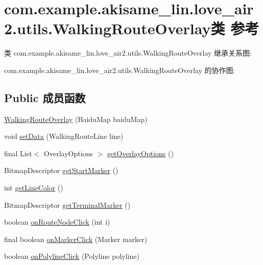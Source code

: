 \hypertarget{classcom_1_1example_1_1akisame__lin_1_1love__air2_1_1utils_1_1_walking_route_overlay}{}\section{com.\+example.\+akisame\+\_\+lin.\+love\+\_\+air2.\+utils.\+Walking\+Route\+Overlay类 参考}
\label{classcom_1_1example_1_1akisame__lin_1_1love__air2_1_1utils_1_1_walking_route_overlay}


类 com.\+example.\+akisame\+\_\+lin.\+love\+\_\+air2.\+utils.\+Walking\+Route\+Overlay 继承关系图\+:


com.\+example.\+akisame\+\_\+lin.\+love\+\_\+air2.\+utils.\+Walking\+Route\+Overlay 的协作图\+:
\subsection*{Public 成员函数}
\begin{DoxyCompactItemize}
\item 
\mbox{\hyperlink{classcom_1_1example_1_1akisame__lin_1_1love__air2_1_1utils_1_1_walking_route_overlay_a8b1c36c3cc467f6e9e734f0984b8d080}{Walking\+Route\+Overlay}} (Baidu\+Map baidu\+Map)
\item 
void \mbox{\hyperlink{classcom_1_1example_1_1akisame__lin_1_1love__air2_1_1utils_1_1_walking_route_overlay_accd02c73c3086cfb88064f6dbd41a7fd}{set\+Data}} (Walking\+Route\+Line line)
\item 
final List$<$ Overlay\+Options $>$ \mbox{\hyperlink{classcom_1_1example_1_1akisame__lin_1_1love__air2_1_1utils_1_1_walking_route_overlay_a7cfd365f9ab6dee9e961e9c676eba417}{get\+Overlay\+Options}} ()
\item 
Bitmap\+Descriptor \mbox{\hyperlink{classcom_1_1example_1_1akisame__lin_1_1love__air2_1_1utils_1_1_walking_route_overlay_aa8822a3ec8bf8a78a2d8d97c031c6394}{get\+Start\+Marker}} ()
\item 
int \mbox{\hyperlink{classcom_1_1example_1_1akisame__lin_1_1love__air2_1_1utils_1_1_walking_route_overlay_a37a984e1264b4f1d481d1df4667d1111}{get\+Line\+Color}} ()
\item 
Bitmap\+Descriptor \mbox{\hyperlink{classcom_1_1example_1_1akisame__lin_1_1love__air2_1_1utils_1_1_walking_route_overlay_af8493179ebadee46237b3ee62e646805}{get\+Terminal\+Marker}} ()
\item 
boolean \mbox{\hyperlink{classcom_1_1example_1_1akisame__lin_1_1love__air2_1_1utils_1_1_walking_route_overlay_a147625d8572b930ecad38fb19c2f8dcf}{on\+Route\+Node\+Click}} (int i)
\item 
final boolean \mbox{\hyperlink{classcom_1_1example_1_1akisame__lin_1_1love__air2_1_1utils_1_1_walking_route_overlay_aa9f1527cb9c4142e8552a77ab6c2bf2e}{on\+Marker\+Click}} (Marker marker)
\item 
boolean \mbox{\hyperlink{classcom_1_1example_1_1akisame__lin_1_1love__air2_1_1utils_1_1_walking_route_overlay_a208bbc818f66e7aa8d27d0e60e30b208}{on\+Polyline\+Click}} (Polyline polyline)
\end{DoxyCompactItemize}
